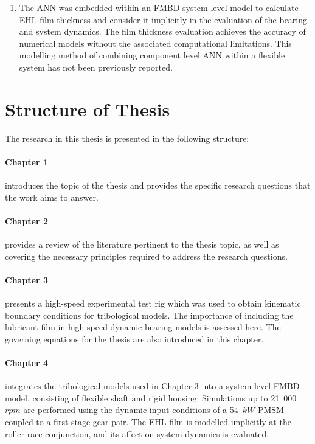 \begin{enumerate}
	\item The ANN was embedded within an FMBD system-level model to calculate EHL film thickness and consider it implicitly in the evaluation of the bearing and system dynamics. The film thickness evaluation achieves the accuracy of numerical models without the associated computational limitations. This modelling method of combining component level ANN within a flexible system has not been previously reported.
\end{enumerate}

\section{Structure of Thesis} \label{Structure of Thesis}

The research in this thesis is presented in the following structure:

\paragraph{Chapter 1} introduces the topic of the thesis and provides the specific research questions that the work aims to answer.

\paragraph{Chapter 2} provides a review of the literature pertinent to the thesis topic, as well as covering the necessary principles required to address the research questions.

\paragraph{Chapter 3} presents a high-speed experimental test rig which was used to obtain kinematic boundary conditions for tribological models. The importance of including the lubricant film in high-speed dynamic bearing models is assessed here. The governing equations for the thesis are also introduced in this chapter.

\paragraph{Chapter 4} integrates the tribological models used in Chapter 3 into a system-level FMBD model, consisting of flexible shaft and rigid housing. Simulations up to 21~000~$rpm$ are performed using the dynamic input conditions of a 54~$kW$ PMSM coupled to a first stage gear pair. The EHL film is modelled implicitly at the roller-race conjunction, and its affect on system dynamics is evaluated.

